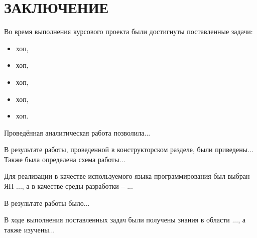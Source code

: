 \section*{ЗАКЛЮЧЕНИЕ}

Во время выполнения курсового проекта были достигнуты поставленные задачи:
\begin{itemize}
\item хоп,
\item хоп,
\item хоп,
\item хоп,
\item хоп.
\end{itemize}

Проведённая аналитическая работа позволила...

В результате работы, проведенной в конструкторском разделе, были приведены... Также была определена схема работы...

Для реализации в качестве используемого языка программирования был выбран ЯП ..., а в качестве среды разработки -- ...

В результате работы было...

В ходе выполнения поставленных задач были получены знания в области ..., а также изучены...
\pagebreak